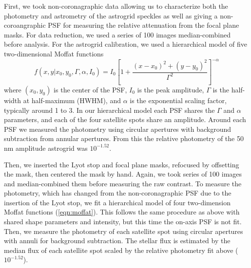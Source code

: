 \documentclass[]{spie}  %
\begin{document}
First, we took non-coronagraphic data allowing us to characterize both the photometry and astrometry of the astrogrid speckles as well as giving a non-coroangraphic PSF for measuring the relative attenuation from the focal plane masks. For data reduction, we used a series of 100 images median-combined before analysis. For the astrogrid calibration, we used a hierarchical model of five two-dimensional Moffat functions
\begin{equation}
   \label{eqn:moffat}
   f(x, y | x_0, y_0, \Gamma, \alpha, I_0) = I_0 \left[1 + \frac{\left(x-x_0\right)^2 + \left(y-y_0\right)^2}{\Gamma^2} \right]^{-\alpha}
\end{equation}
where $(x_0, y_0)$ is the center of the PSF, $I_0$ is the peak amplitude, $\Gamma$ is the half-width at half-maximum (HWHM), and $\alpha$ is the exponential scaling factor, typically around 1 to 3. In our hierarchical model each PSF shares the $\Gamma$ and $\alpha$ parameters, and each of the four satellite spots share an amplitude. Around each PSF we measured the photometry using circular apertures with background subtraction from annular apertures. From this the relative photometry of the 50 nm amplitude astrogrid was $10^{-1.52}$.

Then, we inserted the Lyot stop and focal plane masks, refocused by offsetting the mask, then centered the mask by hand. Again, we took series of 100 images and median-combined them before measuring the raw contrast. To measure the photometry, which has changed from the non-coronagraphic PSF due to the insertion of the Lyot stop, we fit a hierarchical model of four two-dimension Moffat functions (\autoref{eqn:moffat}). This follows the same procedure as above with shared shape parameters and intensity, but this time the on-axis PSF is not fit. Then, we measure the photometry of each satellite spot using circular apertures with annuli for background subtraction. The stellar flux is estimated by the median flux of each satellite spot scaled by the relative photometry fit above ($10^{-1.52}$).
\end{document}
